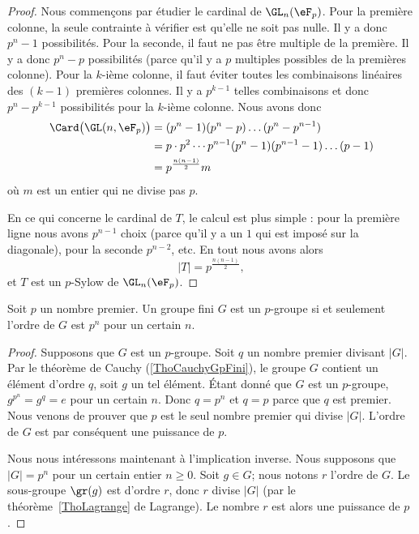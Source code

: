 \begin{proof}
	Nous commençons par étudier le cardinal de \( \GL_n(\eF_p)\). Pour la première colonne, la seule contrainte à vérifier est qu'elle ne soit pas nulle. Il y a donc \( p^n-1\) possibilités. Pour la seconde, il faut ne pas être multiple de la première. Il y a donc \( p^n-p\) possibilités (parce qu'il y a \( p\) multiples possibles de la premières colonne). Pour la \( k\)-ième colonne, il faut éviter toutes les combinaisons linéaires des \( (k-1)\) premières colonnes. Il y a \( p^{k-1}\) telles combinaisons et donc \( p^n-p^{k-1}\) possibilités pour la \( k\)-ième colonne. Nous avons donc
	\begin{subequations}
		\begin{align}
			\Card\big( \GL(n,\eF_{p}) \big) & =(p^n-1)(p^n-p)\ldots(p^n-p^{n-1})                      \\
			                                & =p\cdot p^2\cdots p^{n-1}(p^n-1)(p^{n-1}-1)\ldots (p-1) \\
			                                & =p^{\frac{ n(n-1) }{2}}m
		\end{align}
	\end{subequations}
	où \( m\) est un entier qui ne divise pas \( p\).

	En ce qui concerne le cardinal de \( T\), le calcul est plus simple : pour la première ligne nous avons \( p^{n-1}\) choix (parce qu'il y a un \( 1\) qui est imposé sur la diagonale), pour la seconde \( p^{n-2}\), etc. En tout nous avons alors
	\begin{equation}
		| T |=p^{\frac{ n(n-1) }{2}},
	\end{equation}
	et \( T\) est un \( p\)-Sylow de \( \GL_n(\eF_p)\).
\end{proof}


\begin{proposition}
	Soit \( p\) un nombre premier. Un groupe fini \( G\) est un $p$-groupe si et seulement l'ordre de \( G\) est \( p^n\) pour un certain \( n\).
\end{proposition}

\begin{proof}
	Supposons que \( G\) est un $p$-groupe. Soit \( q\) un nombre premier divisant \( | G |\). Par le théorème de Cauchy (\ref{ThoCauchyGpFini}), le groupe \( G\) contient un élément d'ordre \( q\), soit \( g\) un tel élément. Étant donné que \( G\) est un $p$-groupe, \( g^{p^n}=g^q=e\) pour un certain \( n\). Donc $q=p^n$ et \( q=p\) parce que \( q\) est premier. Nous venons de prouver que \( p\) est le seul nombre premier qui divise \( | G |\). L'ordre de \( G\) est par conséquent une puissance de \( p\).

	Nous nous intéressons maintenant à l'implication inverse. Nous supposons que \( | G |=p^n\) pour un certain entier \( n\geq 0\). Soit \( g\in G\); nous notons \( r\) l'ordre de \( G\). Le sous-groupe \( \gr(g)\) est d'ordre \( r\), donc \( r\) divise \( | G |\) (par le théorème~\ref{ThoLagrange} de Lagrange). Le nombre \( r\) est alors une puissance de \( p\).
\end{proof}

